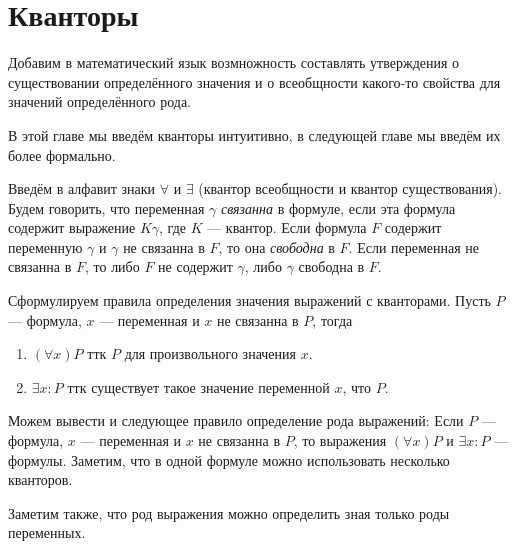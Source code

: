 \section{Кванторы}

Добавим в математический язык возмножность составлять утверждения о существовании
определённого значения и о всеобщности какого-то свойства для значений
определённого рода.

В этой главе мы введём кванторы интуитивно, в следующей главе
мы введём их более формально.

Введём в алфавит знаки $\forall$ и $\exists$ (квантор всеобщности и
квантор существования). Будем говорить, что переменная $\gamma$
{\it связанна} в формуле, если эта формула содержит выражение $K\gamma$,
где $K$ --- квантор. Если формула $F$ содержит переменную $\gamma$ и $\gamma$
не связанна в $F$, то она {\it свободна} в $F$. Если переменная не связанна в $F$,
то либо $F$ не содержит $\gamma$, либо $\gamma$ свободна в $F$.

Сформулируем правила определения значения выражений с кванторами.
Пусть $P$ --- формула, $x$ --- переменная и $x$ не связанна в $P$, тогда
\begin{enumerate}
	\item{}$(\forall x)P$ ттк $P$ для произвольного значения $x$.
	\item{}$\exists x:P$ ттк существует такое значение переменной $x$, что $P$.
\end{enumerate}

Можем вывести и следующее правило определение рода выражений:
Если $P$ --- формула, $x$ --- переменная и $x$ не связанна в $P$,
то выражения $(\forall x)P$ и ${\exists x:P}$ --- формулы.
Заметим, что в одной формуле можно использовать несколько кванторов.

Заметим также, что род выражения можно определить зная только роды переменных.




